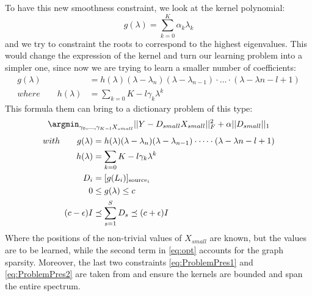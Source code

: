 To have this new smoothness constraint, we look at the kernel polynomial:
\begin{equation}
g(\lambda) = \sum_{k=0}^{K}\alpha_k \lambda_k
\end{equation}
and we try to constraint the roots to correspond to the highest eigenvalues. This would change the expression of the kernel and turn our learning problem into a simpler one, since now we are trying to learn a smaller number of coefficients:
\begin{align}
g(\lambda) &= h(\lambda)(\lambda - \lambda_n)(\lambda - \lambda_{n-1})\cdot \dots \cdot (\lambda - \lambda{n-l+1})\\
where \qquad h(\lambda) &= \sum_{k=0}{K-l}\gamma_k\lambda^{k}
\label{eq:polynom}
\end{align}
This formula them can bring to a dictionary problem of this type:
\begin{equation}
\argmin_{\gamma_0,\dots,\gamma_{K-l}X_{small}} ||Y - D_{small}X_{small}||^2_F + \alpha||D_{small}||_1
\label{eq:opt}
\end{equation}
\begin{align}
with \qquad g(\lambda) &= h(\lambda)(\lambda - \lambda_n)(\lambda - \lambda_{n-1})\cdot \dots \cdot (\lambda - \lambda{n-l+1}) \notag\\
h(\lambda) &= \sum_{k=0}{K-l}\gamma_k\lambda^{k} \notag\\
D_i &= [g(L_i)]_{\text{source}_i} \notag\\
0 &\leq g(\lambda) \leq c \label{eq:ProblemPres1}\\
(c-\epsilon)I &\preceq \sum_{s=1}^{S}D_s \preceq (c+\epsilon)I \label{eq:ProblemPres2}
\end{align}
Where the positions of the non-trivial values of $X_{small}$ are known, but the values are to be learned, while the second term in \autoref{eq:opt} accounts for the graph sparsity. Moreover, the last two constraints \ref{eq:ProblemPres1} and \ref{eq:ProblemPres2} are taken from \cite{Thanou2014} and ensure the kernels are bounded and span the entire spectrum.
\label{sec:DictionaryLearningSection}

